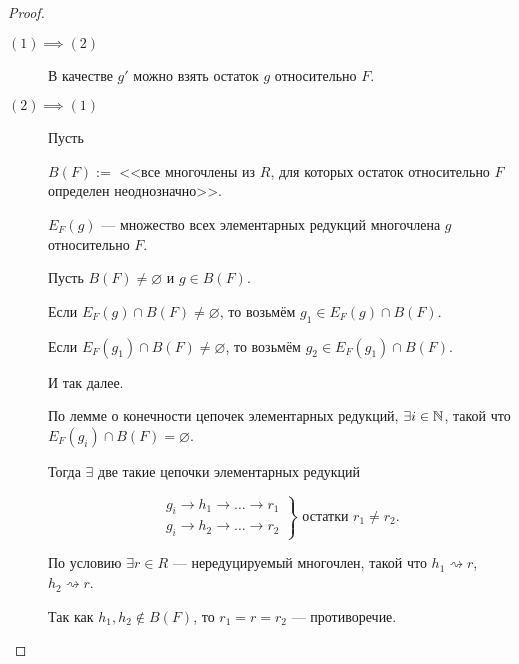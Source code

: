 \begin{proof}~
    \begin{description}
        \item[$(1) \implies (2)$] В качестве $g'$ можно взять остаток $g$ относительно $F$.
        \item[$(2) \implies (1)$] Пусть

            $B(F) := $ <<все многочлены из $R$, для которых остаток относительно $F$ определен неоднозначно>>.

            $E_F(g) $ --- множество всех элементарных редукций многочлена $g$ относительно $F$.

            Пусть $B(F) \neq \varnothing$ и $g \in B(F)$.

            Если $E_F(g) \cap B(F) \neq \varnothing$, то возьмём $g_1 \in E_F(g) \cap B(F)$.

            Если $E_F(g_1) \cap B(F) \neq \varnothing$, то возьмём $g_2 \in E_F(g_1) \cap B(F)$.

            И так далее.

            По лемме о конечности цепочек элементарных редукций, $\exists i \in \mathbb{N}$, такой что $E_F(g_i) \cap B(F) = \varnothing$.

            Тогда $\exists$ две такие цепочки элементарных редукций

            \begin{equation*}
                \left.
                \begin{array}{c}
                    g_i \to h_1 \to \dots \to r_1 \\
                    g_i \to h_2 \to \dots \to r_2
                \end{array}
                \right\} \text{ остатки } r_1 \neq r_2
            .\end{equation*}

            По условию $\exists r \in R$ --- нередуцируемый многочлен, такой что $h_1 \rightsquigarrow r$, $h_2 \rightsquigarrow r$.

            Так как $h_1, h_2 \not\in B(F)$, то $r_1 = r = r_2$ --- противоречие.
            \qedhere
    \end{description}
\end{proof}

\begin{comment}~
    \begin{enumerate}
        \item $g \overset{F}{\rightsquigarrow} g_1 \implies \forall m \in M \quad mg \overset{F}{\rightsquigarrow} mg_1$;
        \item $g_1 - g_2 \overset{F}{\rightsquigarrow} 0 \implies \exists g' : g_1 \rightsquigarrow g'$ и $g_2 \rightsquigarrow g'$.
    \end{enumerate}
\end{comment}
